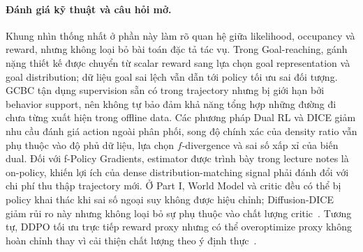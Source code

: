 \paragraph{Đánh giá kỹ thuật và câu hỏi mở.}
Khung nhìn thống nhất ở phần này làm rõ quan hệ giữa likelihood, occupancy và reward, nhưng không loại bỏ bài toán đặc tả tác vụ.
Trong Goal-reaching, gánh nặng thiết kế được chuyển từ scalar reward sang lựa chọn goal representation và goal distribution; dữ liệu goal sai lệch vẫn dẫn tới policy tối ưu sai đối tượng.
GCBC tận dụng supervision sẵn có trong trajectory nhưng bị giới hạn bởi behavior support, nên không tự bảo đảm khả năng tổng hợp những đường đi chưa từng xuất hiện trong offline data.
Các phương pháp Dual RL và DICE giảm nhu cầu đánh giá action ngoài phân phối, song độ chính xác của density ratio vẫn phụ thuộc vào độ phủ dữ liệu, lựa chọn $f$-divergence và sai số xấp xỉ của biến dual.
Đối với f-Policy Gradients, estimator được trình bày trong lecture notes là on-policy, khiến lợi ích của dense distribution-matching signal phải đánh đổi với chi phí thu thập trajectory mới.
Ở Part I, World Model và critic đều có thể bị policy khai thác khi sai số ngoại suy không được hiệu chỉnh; Diffusion-DICE giảm rủi ro này nhưng không loại bỏ sự phụ thuộc vào chất lượng critic~\cite{mao2024diffusiondice}.
Tương tự, DDPO tối ưu trực tiếp reward proxy nhưng có thể overoptimize proxy không hoàn chỉnh thay vì cải thiện chất lượng theo ý định thực~\cite{black2024ddpo}.


